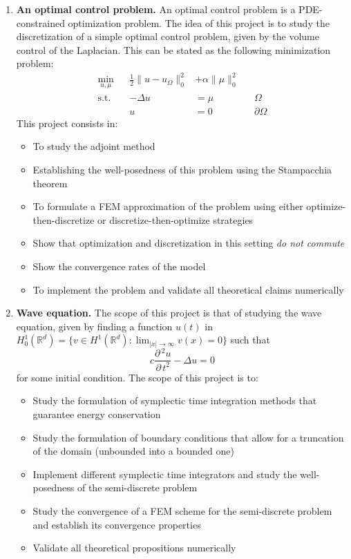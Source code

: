 \documentclass{article}
\newcommand{\R}{\mathbb{R}}
\newcommand{\parder}[2]{\frac{\partial\,#1}{\partial\,#2}}
\begin{document}
\begin{enumerate}
    \item \textbf{An optimal control problem.} An optimal control problem is a PDE-constrained optimization problem. The idea of this project is to study the discretization of a simple optimal control problem, given by the volume control of the Laplacian. This can be stated as the following minimization problem: 
        $$ \begin{aligned} \min_{u,\mu} && \frac 1 2 \|u - u_\Omega\|_0^2 &+ \alpha \|\mu\|_0^2 && \\
            \text{s.t.} && -\Delta u &= \mu &&  \Omega \\
                        && u &= 0 && \partial\Omega
        \end{aligned} $$
        This project consists in:
        \begin{itemize}
            \item To study the adjoint method
            \item Establishing the well-posedness of this problem using the Stampacchia theorem
            \item To formulate a FEM approximation of the problem using either optimize-then-discretize or discretize-then-optimize strategies
            \item Show that optimization and discretization in this setting \emph{do not commute}
            \item Show the convergence rates of the model
            \item To implement the problem and validate all theoretical claims numerically
        \end{itemize}

    \item \textbf{Wave equation.} The scope of this project is that of studying the wave equation, given by finding a function $u(t)$ in $H_0^1(\R^d)=\{v\in H^1(\R^d): \lim_{|x|\to \infty} v(x) = 0\}$  such that
        $$ c\parder{^2 u}{t^2} -\Delta u=0 $$
        for some initial condition. The scope of this project is to:
        \begin{itemize}
            \item Study the formulation of symplectic time integration methods that guarantee energy conservation
            \item Study the formulation of boundary conditions that allow for a truncation of the domain (unbounded into a bounded one)
            \item Implement different symplectic time integrators and study the well-posedness of the semi-discrete problem
            \item Study the convergence of a FEM scheme for the semi-discrete problem and establish its convergence properties
            \item Validate all theoretical propositions numerically
        \end{itemize}


\end{enumerate}
\end{document}
